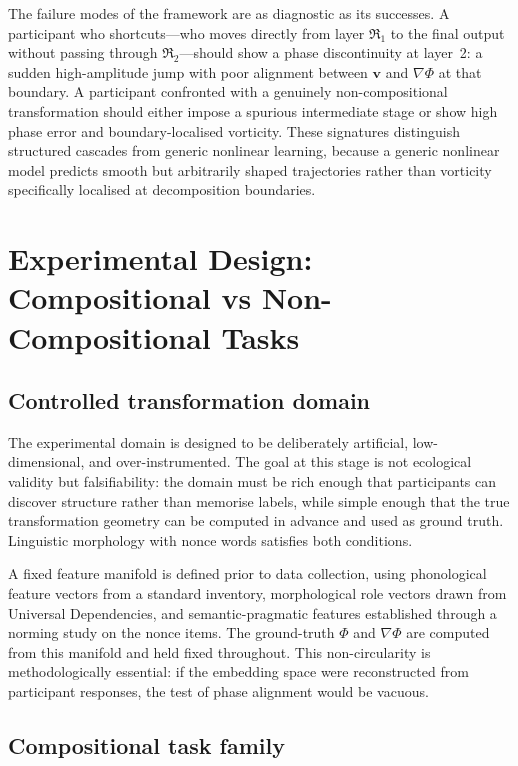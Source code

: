 \documentclass[12pt, a4paper]{article}
\theoremstyle{remark}
\theoremstyle{definition}
\newcommand{\Rk}{\mathfrak{R}}
\newcommand{\vv}{\mathbf{v}}
\newcommand{\Phif}{\Phi}
\begin{document}
The failure modes of the framework are as diagnostic as its successes.  A participant who
shortcuts---who moves directly from layer $\Rk_1$ to the final output without passing
through $\Rk_2$---should show a phase discontinuity at layer~2: a sudden high-amplitude
jump with poor alignment between $\vv$ and $\nabla\Phif$ at that boundary.  A participant
confronted with a genuinely non-compositional transformation should either impose a
spurious intermediate stage or show high phase error and boundary-localised vorticity.
These signatures distinguish structured cascades from generic nonlinear learning, because
a generic nonlinear model predicts smooth but arbitrarily shaped trajectories rather than
vorticity specifically localised at decomposition boundaries.

\section{Experimental Design: Compositional vs Non-Compositional Tasks}
\label{sec:experiment}

\subsection{Controlled transformation domain}

The experimental domain is designed to be deliberately artificial, low-dimensional, and
over-instrumented.  The goal at this stage is not ecological validity but falsifiability:
the domain must be rich enough that participants can discover structure rather than memorise
labels, while simple enough that the true transformation geometry can be computed in
advance and used as ground truth.  Linguistic morphology with nonce words satisfies both
conditions.

A fixed feature manifold is defined prior to data collection, using phonological feature
vectors from a standard inventory, morphological role vectors drawn from Universal
Dependencies, and semantic-pragmatic features established through a norming study on the
nonce items.  The ground-truth $\Phif$ and $\nabla\Phif$ are computed from this manifold
and held fixed throughout.  This non-circularity is methodologically essential: if the
embedding space were reconstructed from participant responses, the test of phase alignment
would be vacuous.

\subsection{Compositional task family}
\end{document}
